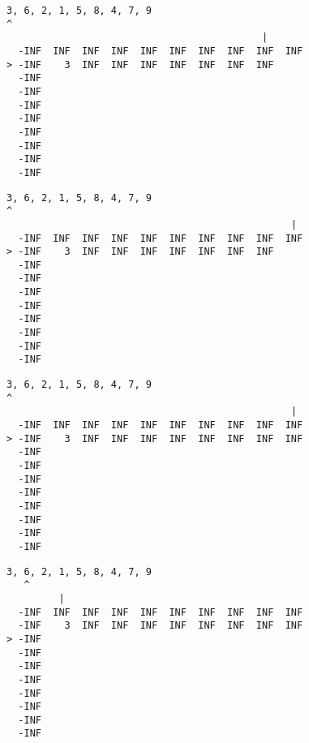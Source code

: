 { \begin{verbatim}
3, 6, 2, 1, 5, 8, 4, 7, 9
^
                                            |
  -INF  INF  INF  INF  INF  INF  INF  INF  INF  INF
> -INF    3  INF  INF  INF  INF  INF  INF  INF     
  -INF                                             
  -INF                                             
  -INF                                             
  -INF                                             
  -INF                                             
  -INF                                             
  -INF                                             
  -INF                                             
\end{verbatim} }

{ \begin{verbatim}
3, 6, 2, 1, 5, 8, 4, 7, 9
^
                                                 |
  -INF  INF  INF  INF  INF  INF  INF  INF  INF  INF
> -INF    3  INF  INF  INF  INF  INF  INF  INF     
  -INF                                             
  -INF                                             
  -INF                                             
  -INF                                             
  -INF                                             
  -INF                                             
  -INF                                             
  -INF                                             
\end{verbatim} }

{ \begin{verbatim}
3, 6, 2, 1, 5, 8, 4, 7, 9
^
                                                 |
  -INF  INF  INF  INF  INF  INF  INF  INF  INF  INF
> -INF    3  INF  INF  INF  INF  INF  INF  INF  INF
  -INF                                             
  -INF                                             
  -INF                                             
  -INF                                             
  -INF                                             
  -INF                                             
  -INF                                             
  -INF                                             
\end{verbatim} }

{ \begin{verbatim}
3, 6, 2, 1, 5, 8, 4, 7, 9
   ^
         |
  -INF  INF  INF  INF  INF  INF  INF  INF  INF  INF
  -INF    3  INF  INF  INF  INF  INF  INF  INF  INF
> -INF                                             
  -INF                                             
  -INF                                             
  -INF                                             
  -INF                                             
  -INF                                             
  -INF                                             
  -INF                                             
\end{verbatim} }

